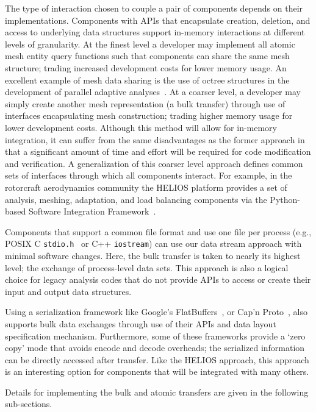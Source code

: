 The type of interaction chosen to couple a pair of components depends on their
implementations.
Components with APIs that encapsulate creation, deletion, and access to
underlying data structures support in-memory interactions at different levels of
granularity.
At the finest level a developer may implement all atomic mesh entity query
functions such that components can share the same mesh structure; trading
increased development costs for lower memory usage.
An excellent example of mesh data sharing is the use of octree structures in the
development of parallel adaptive analyses~\cite{BursteddeWilcoxGhattas11}.
At a coarser level, a developer may simply create another mesh representation (a
bulk transfer) through use of interfaces encapsulating mesh construction;
trading higher memory usage for lower development costs.
Although this method will allow for in-memory integration, it can suffer from
the same disadvantages as the former approach in that a significant amount of
time and effort will be required for code modification and verification.
A generalization of this coarser level approach defines common sets of
interfaces through which all components interact.
For example, in the rotorcraft aerodynamics community the HELIOS
platform provides a set of analysis, meshing, adaptation, and load balancing
components via the Python-based Software Integration
Framework~\cite{sankaran2010application}.

Components that support a common file format and use one file
per process (e.g., POSIX C {\tt stdio.h}~\cite{posixstandard} or
C++ {\tt iostream}) can use our data stream approach with minimal software
changes.
Here, the bulk transfer is taken to nearly its highest level; the exchange of
process-level data sets.
This approach is also a logical choice for legacy analysis codes that do not
provide APIs to access or create their input and output data structures.

Using a serialization framework like Google's FlatBuffers~\cite{flatbuffers}, or
Cap'n Proto~\cite{varda2015cap}, also supports bulk data exchanges 
through use of their APIs and data layout specification mechanism.
Furthermore, some of these frameworks provide a `zero copy' mode that avoids
encode and decode overheads; the serialized information can be directly accessed
after transfer.
Like the HELIOS approach, this approach is an interesting option for components
that will be integrated with many others.

Details for implementing the bulk and atomic transfers are given in the
following sub-sections.


